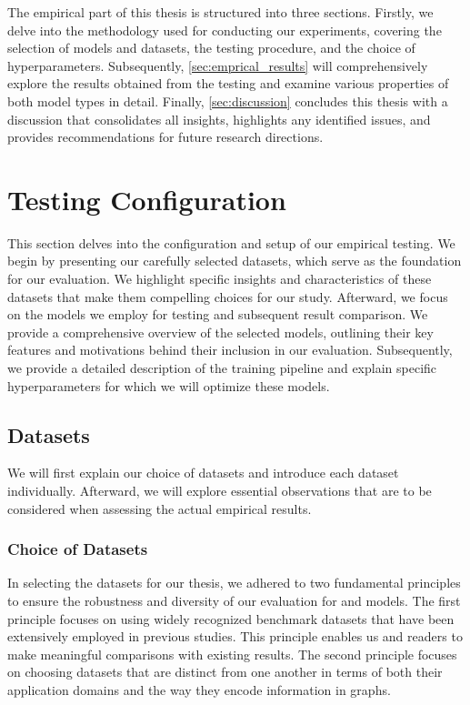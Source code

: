 The empirical part of this thesis is structured into three sections. Firstly, we delve into the methodology used for conducting our experiments, covering the selection of models and datasets, the testing procedure, and the choice of hyperparameters. Subsequently, \cref{sec:emprical_results} will comprehensively explore the results obtained from the testing and examine various properties of both model types in detail. Finally, \cref{sec:discussion} concludes this thesis with a discussion that consolidates all insights, highlights any identified issues, and provides recommendations for future research directions.

\section{Testing Configuration}\label{sec:testing_configuration}
This section delves into the configuration and setup of our empirical testing. We begin by presenting our carefully selected datasets, which serve as the foundation for our evaluation. We highlight specific insights and characteristics of these datasets that make them compelling choices for our study. Afterward, we focus on the models we employ for testing and subsequent result comparison. We provide a comprehensive overview of the selected models, outlining their key features and motivations behind their inclusion in our evaluation. Subsequently, we provide a detailed description of the training pipeline and explain specific hyperparameters for which we will optimize these models.

\subsection{Datasets}\label{sec:datasets}
We will first explain our choice of datasets and introduce each dataset individually. Afterward, we will explore essential observations that are to be considered when assessing the actual empirical results.

\subsubsection{Choice of Datasets}
In selecting the datasets for our thesis, we adhered to two fundamental principles to ensure the robustness and diversity of our evaluation for \gnn and \wlnn models. The first principle focuses on using widely recognized benchmark datasets that have been extensively employed in previous studies. This principle enables us and readers to make meaningful comparisons with existing results. The second principle focuses on choosing datasets that are distinct from one another in terms of both their application domains and the way they encode information in graphs.

